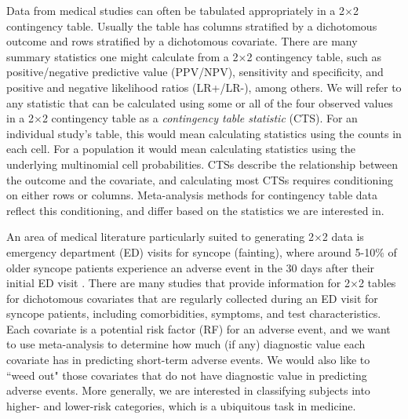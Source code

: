 \documentclass[AMA,STIX1COL]{WileyNJD-v2}
\begin{document}
Data from medical studies can often be tabulated appropriately in a 2$\times$2 contingency table. Usually the table has columns stratified by a dichotomous outcome and rows stratified by a dichotomous covariate. There are many summary statistics one might calculate from a 2$\times$2 contingency table, such as positive/negative predictive value (PPV/NPV), sensitivity and specificity, and positive and negative likelihood ratios (LR+/LR-), among others. We will refer to any statistic that can be calculated using some or all of the four observed values in a 2$\times$2 contingency table as a \textit{contingency table statistic} (CTS). For an individual study's table, this would mean calculating statistics using the counts in each cell. For a population it would mean calculating statistics using the underlying multinomial cell probabilities. CTSs describe the relationship between the outcome and the covariate, and calculating most CTSs requires conditioning on either rows or columns. Meta-analysis methods for contingency table data reflect this conditioning, and differ based on the statistics we are interested in. 

An area of medical literature particularly suited to generating 2$\times$2 data is emergency department (ED) visits for syncope (fainting), where around 5-10\% of older syncope patients experience an adverse event in the 30 days after their initial ED visit \citep{gibson2018}. There are many studies that provide information for 2$\times$2 tables for dichotomous covariates that are regularly collected during an ED visit for syncope patients, including comorbidities, symptoms, and test characteristics. Each covariate is a potential risk factor (RF) for an adverse event, and we want to use meta-analysis to determine how much (if any) diagnostic value each covariate has in predicting short-term adverse events. We would also like to ``weed out" those covariates that do not have diagnostic value in predicting adverse events. More generally, we are interested in classifying subjects into higher- and lower-risk categories, which is a ubiquitous task in medicine. 
\end{document}
